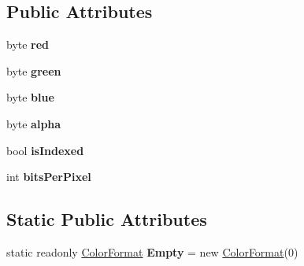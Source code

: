 \subsection*{Public Attributes}
\begin{DoxyCompactItemize}
\item 
\hypertarget{struct_open_t_k_1_1_graphics_1_1_color_format_ad3e78b90f3f3596210b0005f7a96369a}{byte {\bfseries red}}\label{struct_open_t_k_1_1_graphics_1_1_color_format_ad3e78b90f3f3596210b0005f7a96369a}

\item 
\hypertarget{struct_open_t_k_1_1_graphics_1_1_color_format_a64282391d284be98fac4d45be11171b8}{byte {\bfseries green}}\label{struct_open_t_k_1_1_graphics_1_1_color_format_a64282391d284be98fac4d45be11171b8}

\item 
\hypertarget{struct_open_t_k_1_1_graphics_1_1_color_format_a68a207fce6379eabdb13664605ab852f}{byte {\bfseries blue}}\label{struct_open_t_k_1_1_graphics_1_1_color_format_a68a207fce6379eabdb13664605ab852f}

\item 
\hypertarget{struct_open_t_k_1_1_graphics_1_1_color_format_a106ae6f5a307d9209c6fbdda0d32d25b}{byte {\bfseries alpha}}\label{struct_open_t_k_1_1_graphics_1_1_color_format_a106ae6f5a307d9209c6fbdda0d32d25b}

\item 
\hypertarget{struct_open_t_k_1_1_graphics_1_1_color_format_abf9d34bd451ac9127ed86b914bfed570}{bool {\bfseries is\-Indexed}}\label{struct_open_t_k_1_1_graphics_1_1_color_format_abf9d34bd451ac9127ed86b914bfed570}

\item 
\hypertarget{struct_open_t_k_1_1_graphics_1_1_color_format_a2542d6f29f9bd048d951666a4622e62a}{int {\bfseries bits\-Per\-Pixel}}\label{struct_open_t_k_1_1_graphics_1_1_color_format_a2542d6f29f9bd048d951666a4622e62a}

\end{DoxyCompactItemize}
\subsection*{Static Public Attributes}
\begin{DoxyCompactItemize}
\item 
\hypertarget{struct_open_t_k_1_1_graphics_1_1_color_format_a567ba4b493c591b6db2a25a9a6f7d2b7}{static readonly \hyperlink{struct_open_t_k_1_1_graphics_1_1_color_format}{Color\-Format} {\bfseries Empty} = new \hyperlink{struct_open_t_k_1_1_graphics_1_1_color_format}{Color\-Format}(0)}\label{struct_open_t_k_1_1_graphics_1_1_color_format_a567ba4b493c591b6db2a25a9a6f7d2b7}

\end{DoxyCompactItemize}
